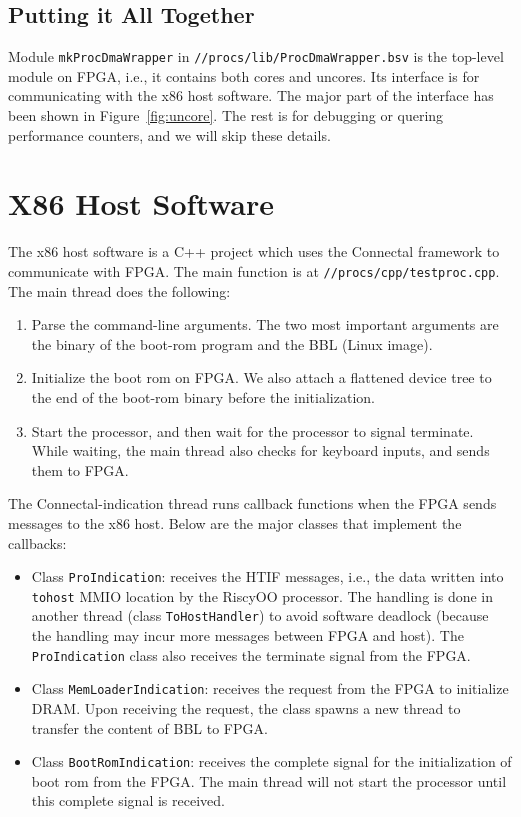 \documentclass[12pt]{article}
\newcommand{\code}[1]{\texttt{#1}}
\begin{document}












\subsection{Putting it All Together}
Module \code{mkProcDmaWrapper} in \code{//procs/lib/ProcDmaWrapper.bsv} is the top-level module on FPGA, i.e., it contains both cores and uncores.
Its interface is for communicating with the x86 host software.
The major part of the interface has been shown in Figure~\ref{fig:uncore}.
The rest is for debugging or quering performance counters, and we will skip these details.

\section{X86 Host Software}\label{sec:sw}
The x86 host software is a C++ project which uses the Connectal framework to communicate with FPGA.
The main function is at \code{//procs/cpp/testproc.cpp}.
The main thread does the following:
\begin{enumerate}
    \item Parse the command-line arguments.
    The two most important arguments are the binary of the boot-rom program and the BBL (Linux image).
    \item Initialize the boot rom on FPGA.
    We also attach a flattened device tree to the end of the boot-rom binary before the initialization.
    \item Start the processor, and then wait for the processor to signal terminate.
    While waiting, the main thread also checks for keyboard inputs, and sends them to FPGA.
\end{enumerate}
The Connectal-indication thread runs callback functions when the FPGA sends messages to the x86 host.
Below are the major classes that implement the callbacks:
\begin{itemize}
    \item Class \code{ProIndication}: receives the HTIF messages, i.e., the data written into \code{tohost} MMIO location by the RiscyOO processor.
    The handling is done in another thread (class \code{ToHostHandler}) to avoid software deadlock (because the handling may incur more messages between FPGA and host).
    The \code{ProIndication} class also receives the terminate signal from the FPGA.
    \item Class \code{MemLoaderIndication}: receives the request from the FPGA to initialize DRAM.
    Upon receiving the request, the class spawns a new thread to transfer the content of BBL to FPGA.
    \item Class \code{BootRomIndication}: receives the complete signal for the initialization of boot rom from the FPGA.
    The main thread will not start the processor until this complete signal is received.
\end{itemize}
\end{document}
